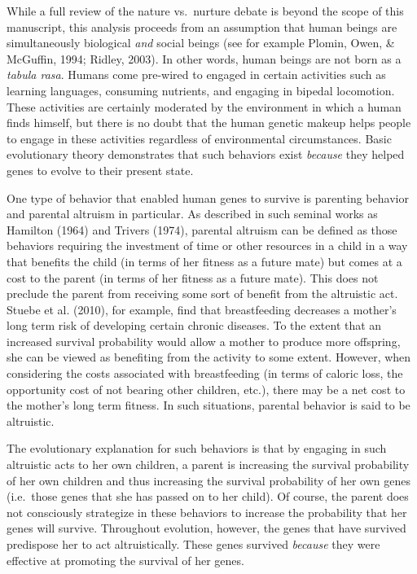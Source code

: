 \documentclass[review]{elsarticle}\usepackage[]{graphicx}\usepackage[]{color}
\begin{document}
While a full review of the nature vs.~nurture debate is beyond the scope
of this manuscript, this analysis proceeds from an assumption that human
beings are simultaneously biological \emph{and} social beings (see for
example Plomin, Owen, \& McGuffin, 1994; Ridley, 2003). In other words,
human beings are not born as a \emph{tabula rasa}. Humans come pre-wired
to engaged in certain activities such as learning languages, consuming
nutrients, and engaging in bipedal locomotion. These activities are
certainly moderated by the environment in which a human finds himself,
but there is no doubt that the human genetic makeup helps people to
engage in these activities regardless of environmental circumstances.
Basic evolutionary theory demonstrates that such behaviors exist
\emph{because} they helped genes to evolve to their present state.

One type of behavior that enabled human genes to survive is parenting
behavior and parental altruism in particular. As described in such
seminal works as Hamilton (1964) and Trivers (1974), parental altruism
can be defined as those behaviors requiring the investment of time or
other resources in a child in a way that benefits the child (in terms of
her fitness as a future mate) but comes at a cost to the parent (in
terms of her fitness as a future mate). This does not preclude the
parent from receiving some sort of benefit from the altruistic act.
Stuebe et al. (2010), for example, find that breastfeeding decreases a
mother's long term risk of developing certain chronic diseases. To the
extent that an increased survival probability would allow a mother to
produce more offspring, she can be viewed as benefiting from the
activity to some extent. However, when considering the costs associated
with breastfeeding (in terms of caloric loss, the opportunity cost of
not bearing other children, etc.), there may be a net cost to the
mother's long term fitness. In such situations, parental behavior is
said to be altruistic.

The evolutionary explanation for such behaviors is that by engaging in
such altruistic acts to her own children, a parent is increasing the
survival probability of her own children and thus increasing the
survival probability of her own genes (i.e.~those genes that she has
passed on to her child). Of course, the parent does not consciously
strategize in these behaviors to increase the probability that her genes
will survive. Throughout evolution, however, the genes that have
survived predispose her to act altruistically. These genes survived
\emph{because} they were effective at promoting the survival of her
genes.
\end{document}
